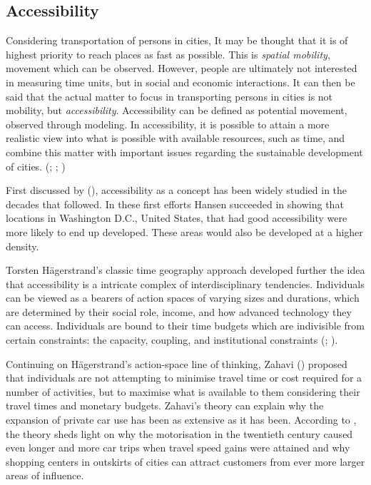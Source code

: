 \newpage
\subsection{Accessibility}
\justify

Considering transportation of persons in cities, It may be thought that it is of highest priority to reach places as fast as possible. This is \textit{spatial mobility}, movement which can be observed. However, people are ultimately not interested in measuring time units, but in social and economic interactions. It can then be said that the actual matter to focus in transporting persons in cities is not mobility, but \textit{accessibility}. Accessibility can be defined as potential movement, observed through modeling. In accessibility, it is possible to attain a more realistic view into what is possible with available resources, such as time, and combine this matter with important issues regarding the sustainable development of cities. (\cite{Hodge1997}; \cite{Tenkanen2017}; \cite{Cervero2017})

First discussed by \citeauthor{Hansen1959} (\citeyear{Hansen1959}), accessibility as a concept has been widely studied in the decades that followed. In these first efforts Hansen succeeded in showing that locations in Washington D.C., United States, that had good accessibility were more likely to end up developed. These areas would also be developed at a higher density.

Torsten Hägerstrand's classic time geography approach developed further the idea that accessibility is a intricate complex of interdisciplinary tendencies. Individuals can be viewed as a bearers of action spaces of varying sizes and durations, which are determined by their social role, income, and how advanced technology they can access. Individuals are bound to their time budgets which are indivisible from certain constraints: the capacity, coupling, and institutional constraints (\cite{Wegener1999}; \cite{Hagerstrand1970}).

Continuing on Hägerstrand's action-space line of thinking, Zahavi (\citeyear{Zahavi1974}) proposed that individuals are not attempting to minimise travel time or cost required for a number of activities, but to maximise what is available to them considering their travel times and monetary budgets. Zahavi's theory can explain why the expansion of private car use has been as extensive as it has been. According to , the theory sheds light on why the motorisation in the twentieth century caused even longer and more car trips when travel speed gains were attained and why shopping centers in outskirts of cities can attract customers from ever more larger areas of influence.

